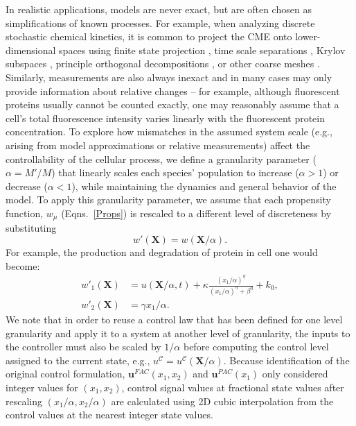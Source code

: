 \documentclass[12pt]{iopart}
\begin{document}
In realistic applications, models are never exact, but are often chosen as simplifications of known processes. 
For example, when analyzing discrete stochastic chemical kinetics, it is common to project the CME onto lower-dimensional spaces using finite state projection , time scale separations , Krylov subspaces , principle orthogonal decompositions \brian[\cite{Vo2019}], or other coarse meshes . 
Similarly, measurements are also always inexact and in many cases may only provide information about relative changes -- for example, although fluorescent proteins usually cannot be counted exactly, one may reasonably assume that a cell's total fluorescence intensity varies linearly with the fluorescent protein concentration. 
To explore how mismatches in the assumed system scale (e.g., arising from model approximations or relative measurements) affect the controllability of the cellular process, we define a granularity parameter ($\alpha=M'/M$) that linearly scales each species' population to increase ($\alpha>1$) or decrease ($\alpha<1$), while maintaining the dynamics and general behavior of the model. 
To apply this granularity parameter, we assume that each propensity function, $w_{\mu}$ (Eqns.\ \ref{Props}) is rescaled to a different level of discreteness by substituting
\begin{equation}\label{eq:granscale}
w'(\mathbf{X})=w(\mathbf{X}/\alpha).
\end{equation}
For example, the production and degradation of protein in cell one would become:
\begin{eqnarray}
w'_1(\mathbf{X}) &= u(\mathbf{X}/\alpha,t)  + \kappa \frac{(x_1/\alpha)^\eta}{(x_1/\alpha)^{\eta}+\beta^{\eta}} + k_0, \nonumber \\
 w'_2(\mathbf{X}) &= \gamma x_1/\alpha. \label{eq:rescaling}
\end{eqnarray}
We note that in order to reuse a control law that has been defined for one level granularity and apply it to a system at another level of granularity, the inputs to the controller must also be scaled by $1/\alpha$ before computing the  control level assigned to the current state, e.g., ${u}^{\mathcal{C}} = {u}^{\mathcal{C}}(\mathbf{X}/\alpha)$. Because identification of the original control formulation, $\mathbf{u}^{FAC}(x_1,x_2)$ and $\mathbf{u}^{PAC}(x_1)$ only considered integer values for $(x_1,x_2)$, control signal values at fractional state values after rescaling $(x_1/\alpha,x_2/\alpha)$ are calculated using 2D cubic interpolation from the control values at the nearest integer state values.
\end{document}
